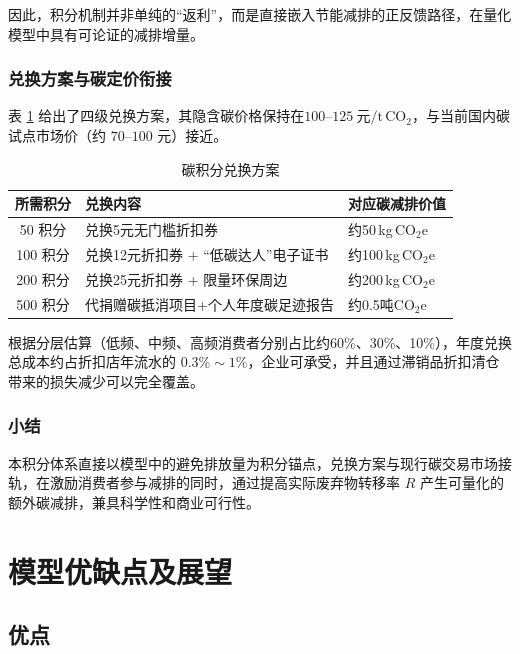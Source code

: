 \documentclass{article}
\begin{document}
因此，积分机制并非单纯的“返利”，而是直接嵌入节能减排的正反馈路径，在量化模型中具有可论证的减排增量。

\subsubsection{兑换方案与碳定价衔接}

表 \ref{tab:credit_redeem} 给出了四级兑换方案，其隐含碳价格保持在$100\text{--}125\ \text{元}/\mathrm{t\,CO_2}$，与当前国内碳试点市场价（约 $70\text{--}100$ 元）接近。

\begin{table}[htbp]
\centering
\caption{碳积分兑换方案}
\label{tab:credit_redeem}
\begin{tabular}{|c|l|l|}
\hline
所需积分 & 兑换内容 & 对应碳减排价值 \\
\hline
50 积分  & 兑换5元无门槛折扣券  & 约50\,kg\,CO$_2$e \\
\hline
100 积分 & 兑换12元折扣券 + “低碳达人”电子证书 & 约100\,kg\,CO$_2$e \\
\hline
200 积分 & 兑换25元折扣券 + 限量环保周边 & 约200\,kg\,CO$_2$e \\
\hline
500 积分 & 代捐赠碳抵消项目+个人年度碳足迹报告 & 约0.5吨CO$_2$e \\
\hline
\end{tabular}
\end{table}

根据分层估算（低频、中频、高频消费者分别占比约60\%、30\%、10\%），年度兑换总成本约占折扣店年流水的 $0.3\%\sim1\%$，企业可承受，并且通过滞销品折扣清仓带来的损失减少可以完全覆盖。

\subsubsection{小结}

本积分体系直接以模型中的避免排放量为积分锚点，兑换方案与现行碳交易市场接轨，在激励消费者参与减排的同时，通过提高实际废弃物转移率 $R$ 产生可量化的额外碳减排，兼具科学性和商业可行性。


\section{模型优缺点及展望}
\subsection{优点}
\end{document}
